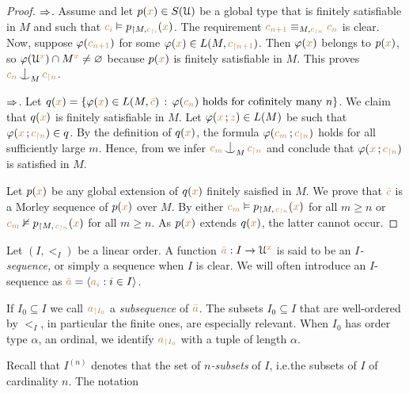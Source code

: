 \begin{proof}
$\Rightarrow$.
Assume  and let $p({\color{brown} x})\in S(\EuScript U)$ be a global type that is finitely satisfiable in $M$ and such that ${\color{brown} c_i}\vDash p_{\restriction M,{\color{brown} c_{\restriction i}}}({\color{brown} x})$.
The requirement ${\color{brown} c_{n+1}}\equiv_{M,{\color{brown} c_{\restriction n}}} {\color{brown} c_n}$ is clear.
Now, suppose $\varphi({\color{brown} c_{n+1}})$ for some $\varphi({\color{brown} x})\in L(M,{\color{brown} c_{\restriction n+1}})$.
Then $\varphi({\color{brown} x})$ belongs to $p({\color{brown} x})$, so $\varphi(\EuScript U^{\color{brown} x})\cap M^{\color{brown} x}\neq\varnothing$ because $p({\color{brown} x})$ is finitely satisfiable in $M$.
This proves ${\mr c_n}\nonfork_M{\mr c_{\restriction n}}$.

$\Rightarrow$.
Let $q({\color{brown} x})=\{\varphi({\color{brown} x})\in L(M, {\color{brown}\bar c})\,:\, \varphi({\color{brown} c_n}) \textrm{ holds for cofinitely many } n\}$.
%
We claim that $q({\color{brown} x})$ is finitely satisfiable in $M$.
%
Let $\varphi({\color{brown} x}\,;{\color{brown} z})\in L(M)$ be such that $\varphi({\color{brown} x}\,;{\color{brown} c_{\restriction n}})\in q$.
%
By the definition of $q({\color{brown} x})$, the formula $\varphi({\color{brown} c_m}\,;{\color{brown} c_{\restriction n}})$ holds for all sufficiently large $m$.
%
Hence, from  we infer ${\mr c_m}\nonfork_M{\mr c_{\restriction n}}$ and conclude that $\varphi({\color{brown} x}\,;{\color{brown} c_{\restriction n}})$ is satisfied in $M$.

Let $p({\color{brown} x})$ be any global extension of $q({\color{brown} x})$ finitely saisfied in $M$.
%
We prove that ${\color{brown}\bar c}$ is a Morley sequence of $p({\color{brown} x})$ over $M$.
%
By  either ${\color{brown} c_m}\vDash p_{\restriction  M,\,{\color{brown} c_{\restriction n}}}({\color{brown} x})$ for all $m\ge n$ or ${\color{brown} c_m}\nvDash p_{\restriction  M,\,{\color{brown} c_{\restriction n}}}({\color{brown} x})$ for all $m\ge n$.
%
As $p({\color{brown} x})$ extends $q({\color{brown} x})$, the latter cannot occur.
\end{proof}

Let $(I,<_I)$ be a linear order.
A function ${\color{brown}\bar a}:I\to\EuScript U^{\color{brown} x}$ is said to be an \emph{$I$-sequence,} or simply a sequence when $I$ is clear.
We will often introduce an $I$-sequence as ${\color{brown}\bar a}=\langle{\color{brown}a_i}: i\in I\rangle$.

If $I_0\subseteq I$ we call ${\color{brown} a_{\restriction I_0}}$ a \emph{subsequence\/} of ${\color{brown}\bar a}$.
The subsets $I_0\subseteq I$ that are well-ordered by $<_I$, in particular the finite ones, are especially relevant.
When $I_0$ has order type $\alpha$, an ordinal, we identify ${\color{brown} a_{\restriction I_0}}$ with a tuple of length $\alpha$.

Recall that \emph{$I^{(n)}$} denotes that the set of \emph{$n$-subsets\/} of $I$,  i.e.\@ the subsets of $I$ of cardinality $n$.
The notation \smallskip

